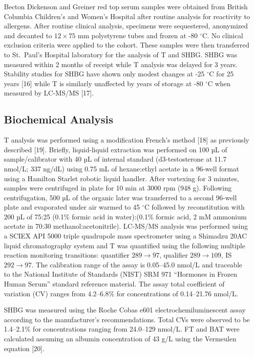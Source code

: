\documentclass[]{elsarticle} %
\begin{document}
Becton Dickenson and Greiner red top serum samples were obtained from
British Columbia Children's and Women's Hospital after routine analysis
for reactivity to allergens. After routine clinical analysis, specimens
were sequestered, anonymized and decanted to \(12\times 75\) mm
polystyrene tubes and frozen at -80 \(^{\circ}\)C. No clinical exclusion
criteria were applied to the cohort. These samples were then transferred
to St.~Paul's Hospital laboratory for the analysis of T and SHBG. SHBG
was measured within 2 months of receipt while T analysis was delayed for
3 years. Stability studies for SHBG have shown only modest changes at
-25 \(^{\circ}\)C for 25 years {[}16{]} while T is similarly unaffected
by years of storage at -80 \(^{\circ}\)C when measured by LC-MS/MS
{[}17{]}.

\hypertarget{biochemical-analysis}{%
\subsection{Biochemical Analysis}\label{biochemical-analysis}}

T analysis was performed using a modification French's method {[}18{]}
as previously described {[}19{]}. Briefly, liquid-liquid extraction was
performed on 100 µL of sample/calibrator with 40 µL of internal standard
(d3-testosterone at 11.7 nmol/L; 337 ng/dL) using 0.75 mL of
hexane:ethyl acetate in a 96-well format using a Hamilton Starlet
robotic liquid handler. After vortexing for 3 minutes, samples were
centrifuged in plate for 10 min at 3000 rpm (948 g). Following
centrifugation, 500 µL of the organic later was transferred to a second
96-well plate and evaporated under air warmed to 45 \(^{\circ}\)C
followed by reconstitution with 200 µL of 75:25 (0.1\% formic acid in
water):(0.1\% formic acid, 2 mM ammonium acetate in 70:30
methanol:acetonitrile). LC-MS/MS analysis was performed using a SCIEX
API 5000 triple quadrupole mass spectrometer using a Shimadzu 20AC
liquid chromatography system and T was quantified using the following
multiple reaction monitoring transitions: quantifier \(289 \to 97\),
qualifier \(289 \to 109\), IS \(292 \to 97\). The calibration range of
the assay is 0.05--45.0 nmol/L and traceable to the National Institute
of Standards (NIST) SRM 971 ``Hormones in Frozen Human Serum'' standard
reference material. The assay total coefficient of variation (CV) ranges
from 4.2--6.8\% for concentrations of 0.14--21.76 nmol/L.

SHBG was measured using the Roche Cobas e601 electrochemiluminescent
assay according to the manufacturer's recommendations. Total CVs were
observed to be 1.4--2.1\% for concentrations ranging from 24.0--129
nmol/L. FT and BAT were calculated assuming an albumin concentration of
43 g/L using the Vermeulen equation {[}20{]}.
\end{document}
